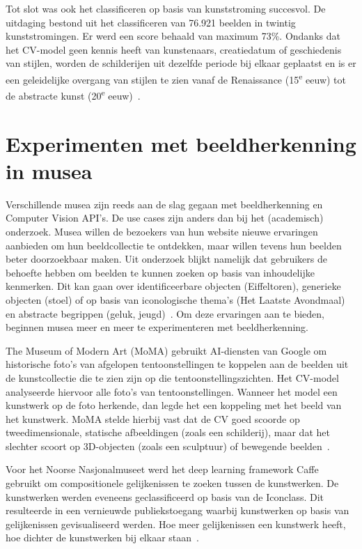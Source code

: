 Tot slot was ook het classificeren op basis van kunststroming succesvol. De uitdaging bestond uit het classificeren van 76.921 beelden in twintig kunststromingen. Er werd een score behaald van maximum 73\%. Ondanks dat het CV-model geen kennis heeft van kunstenaars, creatiedatum of geschiedenis van stijlen, worden de schilderijen uit dezelfde periode bij elkaar geplaatst en is er een geleidelijke overgang van stijlen te zien vanaf de Renaissance (15\textsuperscript{e} eeuw) tot de abstracte kunst (20\textsuperscript{e} eeuw)~\autocite{Elgammal2018}.

\section{Experimenten met beeldherkenning in musea}
\label{sec:beeldherkenning-musea}


Verschillende musea zijn reeds aan de slag gegaan met beeldherkenning en Computer Vision API’s. De use cases zijn anders dan bij het (academisch) onderzoek. Musea willen de bezoekers van hun website nieuwe ervaringen aanbieden om hun beeldcollectie te ontdekken, maar willen tevens hun beelden beter doorzoekbaar maken. Uit onderzoek blijkt namelijk dat gebruikers de behoefte hebben om beelden te kunnen zoeken op basis van inhoudelijke kenmerken. Dit kan gaan over identificeerbare objecten (Eiffeltoren), generieke objecten (stoel) of op basis van iconologische thema’s (Het Laatste Avondmaal) en abstracte begrippen (geluk, jeugd)~\autocite{Vanstappen2019}. Om deze ervaringen aan te bieden, beginnen musea meer en meer te experimenteren met beeldherkenning.


The Museum of Modern Art (MoMA) gebruikt AI-diensten van Google om historische foto’s van afgelopen tentoonstellingen te koppelen aan de beelden uit de kunstcollectie die te zien zijn op die tentoonstellingszichten. Het CV-model analyseerde hiervoor alle foto’s van tentoonstellingen. Wanneer het model een kunstwerk op de foto herkende, dan legde het een koppeling met het beeld van het kunstwerk. MoMA stelde hierbij vast dat de CV goed scoorde op tweedimensionale, statische afbeeldingen (zoals een schilderij), maar dat het slechter scoort op 3D-objecten (zoals een sculptuur) of bewegende beelden~\autocite{MOMA2018?}.

Voor het Noorse Nasjonalmuseet werd het deep learning framework Caffe gebruikt om compositionele gelijkenissen te zoeken tussen de kunstwerken. De kunstwerken werden eveneens geclassificeerd op basis van de Iconclass. Dit resulteerde in een vernieuwde publiekstoegang waarbij kunstwerken op basis van gelijkenissen gevisualiseerd werden. Hoe meer gelijkenissen een kunstwerk heeft, hoe dichter de kunstwerken bij elkaar staan~\autocite{Nasjonalmuseet2017?}.

